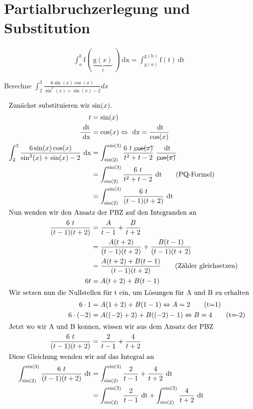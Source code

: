 \documentclass[11pt, a4paper]{article}
\providecommand{\dx}{\ \mathrm{dx}}
\providecommand{\dt}{\ \mathrm{dt}}
\begin{document}
\newpage
\section{Partialbruchzerlegung und Substitution}
\begin{align}
	\int_a^b \mathrm{f}( \ \underbrace{\mathrm{g}(x)}_t \ ) \dx = \int_{\mathrm{g}(a)} ^{\mathrm{g(b)}} \mathrm{f}(t) \dt
	\label{eq:substitution}
\end{align}

Berechne $\displaystyle \int_2^3 \frac{6 \sin(x) \cos(x)}{\sin^2(x) + \sin(x) - 2 } dx$

\begin{align*}
	\intertext{Zunächst substituieren wir $\sin(x)$.}
	t &= \sin(x) \\
	\frac{\dt}{\dx} &= \cos(x) \Leftrightarrow \dx = \frac{\dt}{\cos(x)} \\
	\int_2^3 \frac{6 \sin(x) \cos(x)}{\sin^2(x) + \sin(x) - 2 } \dx &= \int_{\sin(2)}^{\sin(3)} \frac{6 \ t \ \cancel{\cos(x)}}{t^2 + t - 2} \ \frac{\dt}{\cancel{\cos(x)}} \\
	&= \int_{\sin(2)}^{\sin(3)} \frac{6 \ t}{t^2 + t - 2} \dt \tag{PQ-Formel} \\
	&= \int_{\sin(2)}^{\sin(3)} \frac{6 \ t}{(t-1)(t+2)} \dt \\
	\intertext{Nun wenden wir den Ansatz der PBZ auf den Integranden an}
	\frac{6 \ t}{(t-1)(t+2)} &= \frac{A}{t-1} + \frac{B}{t+2} \\
	&= \frac{A (t+2)}{(t-1)(t+2)} + \frac{B (t-1)}{(t-1)(t+2)} \\
	&= \frac{A (t+2) + B (t-1)}{(t-1)(t+2)} \tag{Zähler gleichsetzen} \\
	6t &= A (t+2) + B (t-1) \\
	\intertext{Wir setzen nun die Nullstellen für t ein, um Lösungen für A und B zu erhalten}
	6 \cdot 1 &= A (1+2) + B (1-1) \Leftrightarrow A = 2 \tag{t=1} \\
	6 \cdot (-2) &= A ((-2)+2) + B ((-2)-1) \Leftrightarrow B = 4 \tag{t=-2} \\
	\intertext{Jetzt wo wir A und B kennen, wissen wir aus dem Ansatz der PBZ}
	\frac{6 \ t}{(t-1)(t+2)} &= \frac{2}{t-1} + \frac{4}{t+2} \\
	\intertext{Diese Gleichung wenden wir auf das Integral an}
	 \int_{\sin(2)}^{\sin(3)} \frac{6 \ t}{(t-1)(t+2)} \dt &=  \int_{\sin(2)}^{\sin(3)} \frac{2}{t-1} + \frac{4}{t+2} \dt \\
	 &= \int_{\sin(2)}^{\sin(3)} \frac{2}{t-1} \dt + \int_{\sin(2)}^{\sin(3)} \frac{4}{t+2} \dt \\

\end{align*}
\end{document}
